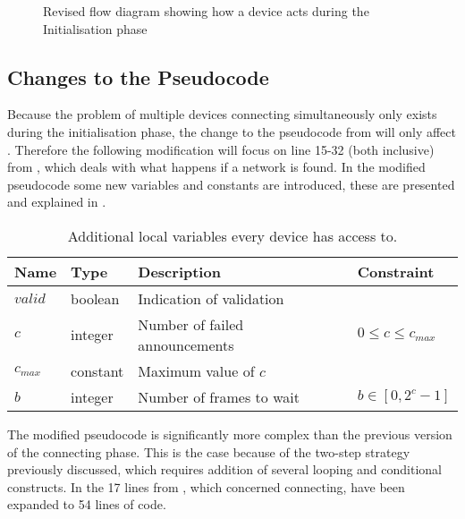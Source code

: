 \begin{figure}[ht]
    \centering \footnotesize
    
    \caption{Revised flow diagram showing how a device acts during the Initialisation phase}
    \label{fig:pseudo_flowMultiConnect}
\end{figure}


\subsection{Changes to the Pseudocode} %
\label{sub:changes_to_the_pseudocode}
Because the problem of multiple devices connecting simultaneously only exists during the initialisation phase, the change to the pseudocode from  will only affect .
Therefore the following modification will focus on line 15-32 (both inclusive) from , which deals with what happens if a network is found.
In the modified pseudocode some new variables and constants are introduced, these are presented and explained in .

\begin{table}[H]
    {\setlength{\extrarowheight}{1ex}%
    \begin{tabularx}{\textwidth}{l|l|X|l}
        \toprule
        Name                & Type      & Description & Constraint \\
        \midrule
        $valid$             & boolean   & Indication of validation              \\
        $c$                 & integer   & Number of failed announcements        & $0 \leq c \leq c_{max}$ \\
        $c_{max}$           & constant   & Maximum value of $c$                        \\
        $b$                 & integer   & Number of frames to wait              & $b \in [0, 2^c-1]$ \\
        \bottomrule
    \end{tabularx}}
    \caption{Additional local variables every device has access to.}
    \label{tab:locals_wmulticonnect} 
    \vspace{-10pt}
\end{table}

\noindent
The modified pseudocode is significantly more complex than the previous version of the connecting phase.
This is the case because of the two-step strategy previously discussed, which requires addition of several looping and conditional constructs.
In  the 17 lines from , which concerned connecting, have been expanded to 54 lines of code. 


